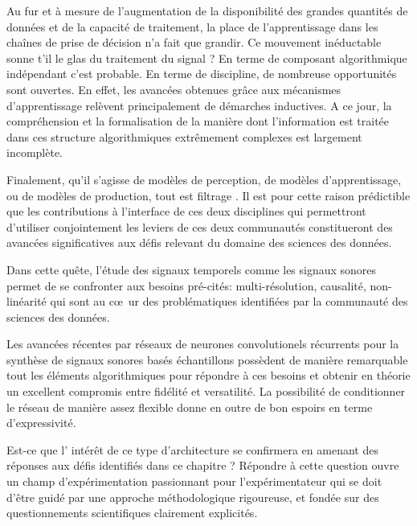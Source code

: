 Au fur et à mesure de l'augmentation de la disponibilité des grandes quantités de données et de la capacité de traitement, la place de l'apprentissage dans les chaînes de prise de décision n'a fait que grandir. Ce mouvement inéductable sonne t'il le glas du traitement du signal ? En terme de composant algorithmique indépendant c'est probable. En terme de discipline, de nombreuse opportunités sont ouvertes. En effet, les avancées obtenues grâce aux mécanismes d'apprentissage relèvent principalement de démarches inductives. A ce jour, la compréhension et la formalisation de la manière dont l'information est traitée dans ces structure algorithmiques extrêmement complexes est largement incomplète.

Finalement, qu'il s'agisse de modèles de perception, de modèles d'apprentissage, ou de modèles de production, \og tout est filtrage \fg. Il est pour cette raison prédictible que les contributions à l'interface de ces deux disciplines qui permettront d'utiliser conjointement les leviers de ces deux communautés\cite{mallat2016understanding} constitueront des avancées significatives aux défis relevant du domaine des sciences des données.

Dans cette quête, l'étude des signaux temporels comme les signaux sonores permet de se confronter aux besoins pré-cités: multi-résolution, causalité, non-linéarité qui sont au c\oe~ur des problématiques identifiées par la communauté des sciences des données.

Les avancées récentes par réseaux de neurones convolutionels récurrents pour la synthèse de signaux sonores basés échantillons
\cite{wavenet} possèdent de manière remarquable tout les éléments algorithmiques pour répondre à ces besoins et obtenir en théorie un excellent compromis entre fidélité et versatilité. La possibilité de conditionner le réseau de manière assez flexible donne en outre de bon espoirs en terme d'expressivité.

Est-ce que l' intérêt de ce type d'architecture se confirmera en amenant des réponses aux défis identifiés dans ce chapitre ? Répondre à cette question ouvre un champ d'expérimentation passionnant pour l'expérimentateur qui se doit d'être guidé par une approche méthodologique rigoureuse, et fondée sur des questionnements scientifiques clairement explicités.
